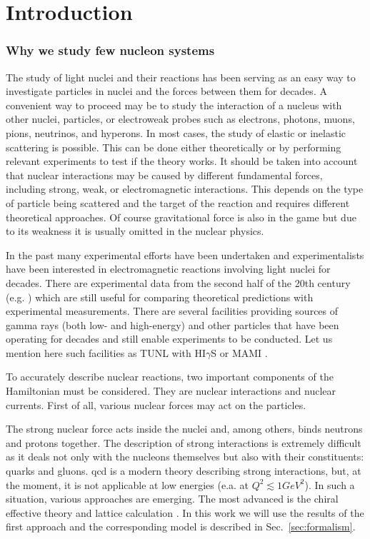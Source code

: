 \chapter{Introduction}
\label{sec:intro}

\subsection*{Why we study few nucleon systems}

The study of light nuclei and their reactions has been serving as an easy way to investigate particles in nuclei and
the forces between them for decades. A convenient way to proceed may be to study the interaction of a nucleus with
other nuclei, particles, or electroweak probes such as electrons, photons, muons, pions, neutrinos, and hyperons.
In most cases, the study of elastic or inelastic scattering is possible. This can be done either theoretically or by
performing relevant experiments to test if the theory works. It should be taken into account that nuclear 
interactions may be
caused by different fundamental forces, including strong, weak, or electromagnetic
interactions. This depends on the type of particle being scattered and the target of the reaction
and requires different theoretical approaches.
Of course gravitational force is also in the game but due to its weakness it is 
usually omitted in the nuclear physics. 

In the past many experimental efforts have been undertaken and
experimentalists have been interested in electromagnetic reactions involving light nuclei for decades.
There are experimental data from the second half of the 20th century 
(e.g. \cite{Skopik1974, Liuexp68, Kose1969MeasurementsOT, Kamae}) which are still 
useful for comparing theoretical predictions with experimental measurements.    
There are several facilities providing sources of gamma rays (both low- and high-energy)
and other particles that have been operating for decades and still enable experiments to be conducted.
Let us mention here such facilities as TUNL with HI$\gamma$S \cite{TUNL, TONCHEV2005170} or MAMI \cite{MAMI}. 

To accurately describe nuclear reactions, two important components of the Hamiltonian must be considered.
They are nuclear interactions and nuclear currents.
First of all, various nuclear forces may act on
the particles.

The strong nuclear force acts inside the nuclei and, among others, binds neutrons 
and protons together. The description of strong interactions is extremely
difficult as it deals not only with the nucleons themselves but also with their constituents: quarks
and gluons. \gls{qcd} is a modern theory
describing strong interactions, but, at the moment,
it is not applicable at low energies (e.a. at $Q^2 \lesssim 1 GeV^2$).
In such a situation, various approaches are emerging.
The most advanced is the
chiral effective theory and lattice calculation \cite{IOFFE2006232, BEANElaticce, Machleidt2011}.
In this work we will use the results of the first approach
and the corresponding model is described in Sec.~\ref{sec:formalism}.

